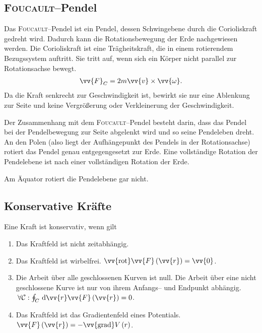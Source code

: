 \subsection{\textsc{Foucault}--Pendel}
Das \textsc{Foucault}--Pendel ist ein Pendel, dessen Schwingebene durch die Corioliskraft gedreht wird.
Dadurch kann die Rotationsbewegung der Erde nachgewiesen werden.
Die Corioliskraft ist eine Trägheitskraft, die in einem rotierendem Bezugssystem auftritt.
Sie tritt auf, wenn sich ein Körper nicht parallel zur Rotationsachse bewegt.
\begin{align} 
        \vv{F}_C=2m\vv{v}\times \vv{\omega }
.\end{align} 
Da die Kraft senkrecht zur Geschwindigkeit ist, bewirkt sie nur eine Ablenkung zur Seite und keine Vergrößerung oder Verkleinerung der Geschwindigkeit.\par
Der Zusammenhang mit dem \textsc{Foucault}--Pendel besteht darin, dass das Pendel bei der Pendelbewegung zur Seite abgelenkt wird und so seine Pendeleben dreht. 
An den Polen (also liegt der Aufhängepunkt des Pendels in der Rotationsachse) rotiert das Pendel genau entgegengesetzt zur Erde.
Eine vollständige Rotation der Pendelebene ist nach einer vollständigen Rotation der Erde.\par
Am Äquator rotiert die Pendelebene gar nicht.

\subsection{Konservative Kräfte}
Eine Kraft ist konservativ, wenn gilt
\begin{enumerate}[label=--]
        \item Das Kraftfeld ist nicht zeitabhängig.
        \item Das Kraftfeld ist wirbelfrei. $\vv{\text{rot}}\vv{F}\left(\vv{r}\right)=\vv{0}$.
        \item Die Arbeit über alle geschlossenen Kurven ist null. Die Arbeit über eine nicht geschlossene Kurve ist nur von ihrem Anfangs-- und Endpunkt abhängig. $\,\forall \mathcal{C}:\oint_{C}^{}\td \vv{r}\vv{F}\left(\vv{r}\right)=0$.
        \item Das Kraftfeld ist das Gradientenfeld eines Potentials. $\vv{F}\left(\vv{r}\right)=-\vv{\text{grad}}V\left(r\right)$.
\end{enumerate}

